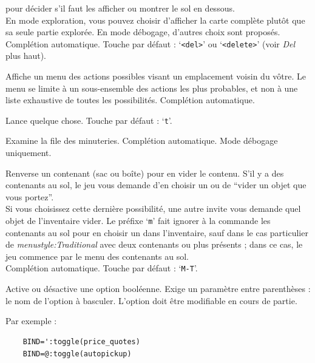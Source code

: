 \documentclass[titlepage]{article}
\begin{document}
\begin{description}[font=\mdseries\ttfamily]
pour décider s'il faut les afficher ou montrer le sol en dessous.\\
En mode exploration, vous pouvez choisir d'afficher la carte complète plutôt
que sa seule partie explorée.
En mode débogage, d'autres choix sont proposés.\\
Complétion automatique.
Touche par défaut : `\texttt{<del>}' ou `\texttt{<delete>}' (voir \textit{Del} plus haut).
\item[\#therecmdmenu]
Affiche un menu des actions possibles visant un emplacement voisin du vôtre.
Le menu se limite à un sous-ensemble des actions les plus probables, et non à
une liste exhaustive de toutes les possibilités.
Complétion automatique.
\item[\#throw]
Lance quelque chose. Touche par défaut : `\texttt{t}'.
\item[\#timeout]
Examine la file des minuteries.
Complétion automatique.
Mode débogage uniquement.
\item[\#tip]
Renverse un contenant (sac ou boîte) pour en vider le contenu.
S'il y a des contenants au sol, le jeu vous demande d'en choisir un
ou de ``vider un objet que vous portez''.
\\
Si vous choisissez cette dernière possibilité, une autre invite vous demande
quel objet de l'inventaire vider.
Le préfixe `\texttt{m}' fait ignorer à la commande les contenants au
sol pour en choisir un dans l'inventaire, sauf dans le cas particulier de
\textit{menustyle:Traditional}
avec deux contenants ou plus présents ; dans ce cas, le jeu commence par le
menu des contenants au sol.
\\
Complétion automatique. Touche par défaut : `\texttt{M-T}'.
\item[\#toggle]
Active ou désactive une option booléenne.
Exige un paramètre entre parenthèses : le nom de l'option à basculer.
L'option doit être modifiable en cours de partie.

Par exemple :
\begin{verbatim}
    BIND=':toggle(price_quotes)
    BIND=@:toggle(autopickup)
\end{verbatim}


\end{description}
\end{document}
